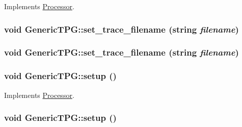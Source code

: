 Implements \hyperlink{classProcessor_3280abfe3637712e09cc651b2d09732e}{Processor}.\hypertarget{classGenericTPG_fe1f30bce868ee2caa01d3f7a2229945}{
\subsubsection[{set\_\-trace\_\-filename}]{\setlength{\rightskip}{0pt plus 5cm}void GenericTPG::set\_\-trace\_\-filename (string {\em filename})}}
\label{classGenericTPG_fe1f30bce868ee2caa01d3f7a2229945}


\hypertarget{classGenericTPG_fe1f30bce868ee2caa01d3f7a2229945}{
\subsubsection[{set\_\-trace\_\-filename}]{\setlength{\rightskip}{0pt plus 5cm}void GenericTPG::set\_\-trace\_\-filename (string {\em filename})}}
\label{classGenericTPG_fe1f30bce868ee2caa01d3f7a2229945}


\hypertarget{classGenericTPG_5cea355b4db26ed22a7af8e54758de47}{
\subsubsection[{setup}]{\setlength{\rightskip}{0pt plus 5cm}void GenericTPG::setup ()}}
\label{classGenericTPG_5cea355b4db26ed22a7af8e54758de47}




Implements \hyperlink{classProcessor_495fad01358e2d9760c526d6e2db53ea}{Processor}.\hypertarget{classGenericTPG_5cea355b4db26ed22a7af8e54758de47}{
\subsubsection[{setup}]{\setlength{\rightskip}{0pt plus 5cm}void GenericTPG::setup ()}}
\label{classGenericTPG_5cea355b4db26ed22a7af8e54758de47}




